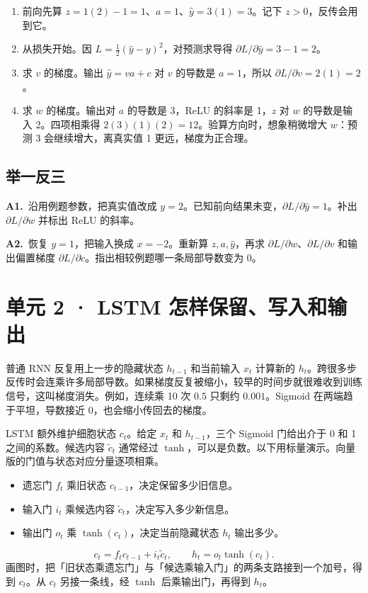 \documentclass[UTF8,a4paper,11pt]{ctexart}
\newcommand{\PracticeQuestion}[3]{\par\Needspace{4\baselineskip}\noindent\begin{minipage}{\linewidth}\textbf{#1.}\ #2\par\noindent\rule{0pt}{#3mm}\par\end{minipage}\par}
\begin{document}
\begin{enumerate}
\item 前向先算 $z=1(2)-1=1$、$a=1$、$\hat y=3(1)=3$。记下 $z>0$，反传会用到它。
\item 从损失开始。因 $L=\tfrac12(\hat y-y)^2$，对预测求导得 $\partial L/\partial\hat y=3-1=2$。
\item 求 $v$ 的梯度。输出 $\hat y=va+c$ 对 $v$ 的导数是 $a=1$，所以 $\partial L/\partial v=2(1)=2$。
\item 求 $w$ 的梯度。输出对 $a$ 的导数是 3，ReLU 的斜率是 1，$z$ 对 $w$ 的导数是输入 2。四项相乘得 $2(3)(1)(2)=12$。验算方向时，想象稍微增大 $w$：预测 3 会继续增大，离真实值 1 更远，梯度为正合理。
\end{enumerate}
\subsection{举一反三}
\PracticeQuestion{A1}{沿用例题参数，把真实值改成 $y=2$。已知前向结果未变，$\partial L/\partial\hat y=1$。补出 $\partial L/\partial w$ 并标出 ReLU 的斜率。}{23}
\PracticeQuestion{A2}{恢复 $y=1$，把输入换成 $x=-2$。重新算 $z,a,\hat y$，再求 $\partial L/\partial w$、$\partial L/\partial v$ 和输出偏置梯度 $\partial L/\partial c$。指出相较例题哪一条局部导数变为 0。}{35}
\clearpage
\section{单元 2 · LSTM 怎样保留、写入和输出}
普通 RNN 反复用上一步的隐藏状态 $h_{t-1}$ 和当前输入 $x_t$ 计算新的 $h_t$。跨很多步反传时会连乘许多局部导数。如果梯度反复被缩小，较早的时间步就很难收到训练信号，这叫梯度消失。例如，连续乘 10 次 $0.5$ 只剩约 $0.001$。Sigmoid 在两端趋于平坦，导数接近 0，也会缩小传回去的梯度。

LSTM 额外维护细胞状态 $c_t$。给定 $x_t$ 和 $h_{t-1}$，三个 Sigmoid 门给出介于 0 和 1 之间的系数。候选内容 $\tilde c_t$ 通常经过 $\tanh$，可以是负数。以下用标量演示。向量版的门值与状态对应分量逐项相乘。

\begin{itemize}
\item 遗忘门 $f_t$ 乘旧状态 $c_{t-1}$，决定保留多少旧信息。
\item 输入门 $i_t$ 乘候选内容 $\tilde c_t$，决定写入多少新信息。
\item 输出门 $o_t$ 乘 $\tanh(c_t)$，决定当前隐藏状态 $h_t$ 输出多少。
\end{itemize}
\[c_t=f_t c_{t-1}+i_t\tilde c_t,\qquad h_t=o_t\tanh(c_t).\]
画图时，把「旧状态乘遗忘门」与「候选乘输入门」的两条支路接到一个加号，得到 $c_t$。从 $c_t$ 另接一条线，经 $\tanh$ 后乘输出门，再得到 $h_t$。
\end{document}
